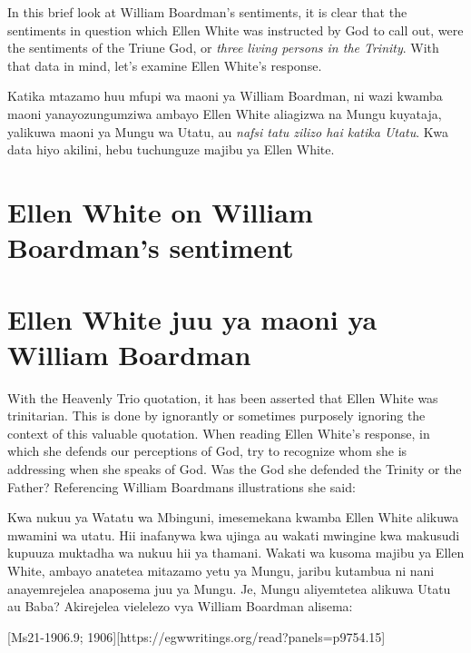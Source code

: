 In this brief look at William Boardman's sentiments, it is clear that the sentiments in question which Ellen White was instructed by God to call out, were the sentiments of the Triune God, or \textit{three living persons in the Trinity}. With that data in mind, let's examine Ellen White's response.


Katika mtazamo huu mfupi wa maoni ya William Boardman, ni wazi kwamba maoni yanayozungumziwa ambayo Ellen White aliagizwa na Mungu kuyataja, yalikuwa maoni ya Mungu wa Utatu, au \textit{nafsi tatu zilizo hai katika Utatu}. Kwa data hiyo akilini, hebu tuchunguze majibu ya Ellen White.


\section*{Ellen White on William Boardman’s sentiment}


\section*{Ellen White juu ya maoni ya William Boardman}


With the Heavenly Trio quotation, it has been asserted that Ellen White was trinitarian. This is done by ignorantly or sometimes purposely ignoring the context of this valuable quotation. When reading Ellen White’s response, in which she defends our perceptions of God, try to recognize whom she is addressing when she speaks of God. Was the God she defended the Trinity or the Father? Referencing William Boardmans illustrations she said:


Kwa nukuu ya Watatu wa Mbinguni, imesemekana kwamba Ellen White alikuwa mwamini wa utatu. Hii inafanywa kwa ujinga au wakati mwingine kwa makusudi kupuuza muktadha wa nukuu hii ya thamani. Wakati wa kusoma majibu ya Ellen White, ambayo anatetea mitazamo yetu ya Mungu, jaribu kutambua ni nani anayemrejelea anaposema juu ya Mungu. Je, Mungu aliyemtetea alikuwa Utatu au Baba? Akirejelea vielelezo vya William Boardman alisema:


[Ms21-1906.9; 1906][https://egwwritings.org/read?panels=p9754.15]


